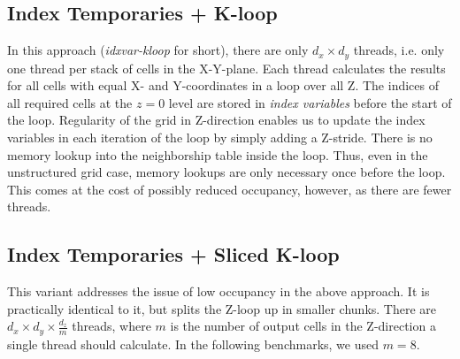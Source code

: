 \subsection{Index Temporaries + K-loop} In this approach (\emph{idxvar-kloop} for short), there are only $d_x\times d_y$ threads, i.e. only one thread per stack of cells in the X-Y-plane. Each thread calculates the results for all cells with equal X- and Y-coordinates in a loop over all Z. The indices of all required cells at the $z=0$ level are stored in \emph{index variables} before the start of the loop. Regularity of the grid in Z-direction enables us to update the index variables in each iteration of the loop by simply adding a Z-stride. There is no memory lookup into the neighborship table inside the loop. Thus, even in the unstructured grid case, memory lookups are only necessary once before the loop. This comes at the cost of possibly reduced occupancy, however, as there are fewer threads.

\subsection{Index Temporaries + Sliced K-loop} This variant addresses the issue of low occupancy in the above approach. It is practically identical to it, but splits the Z-loop up in smaller chunks. There are $d_x\times d_y\times \frac{d_z}{m}$ threads, where $m$ is the number of output cells in the Z-direction a single thread should calculate. In the following benchmarks, we used $m=8$.


